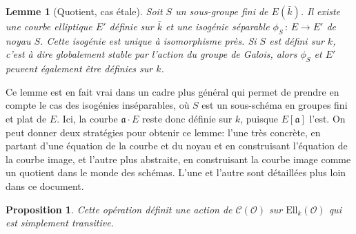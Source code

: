 \documentclass[11pt,a4paper]{article}
\renewcommand{\O}{\mathcal{O}}
\newcommand{\Cl}{\mathcal{C}}
\newcommand{\vers}{\longrightarrow}
\newcommand{\Ell}{\mathrm{Ell}}
\renewcommand{\frak}{\mathfrak}
\newcommand{\de}{\,:\,}
\newtheorem*{lem}{Lemme}
\newtheorem*{prop}{Proposition}
\theoremstyle{definition}
\begin{document}
\begin{lem}[Quotient, cas étale] Soit $S$ un sous-groupe fini de $E(\bar{k})$. Il existe une courbe elliptique $E'$ définie sur $\bar{k}$ et une isogénie séparable $\phi_S\de E\vers E'$ de noyau $S$. Cette isogénie est unique à isomorphisme près. Si $S$ est défini sur $k$, c'est à dire globalement stable par l'action du groupe de Galois, alors $\phi_S$ et $E'$ peuvent également être définies sur $k$.
\end{lem} 

Ce lemme est en fait vrai dans un cadre plus général qui permet de prendre en compte le cas des isogénies inséparables, où $S$ est un sous-schéma en groupes fini et plat de $E$. Ici, la courbe $\frak a\cdot E$ reste donc définie sur $k$, puisque $E[\frak a]$ l'est. On peut donner deux stratégies pour obtenir ce lemme: l'une très concrète, en partant d'une équation de la courbe et du noyau et en construisant l'équation de la courbe image, et l'autre plus abstraite, en construisant la courbe image comme un quotient dans le monde des schémas. L'une et l'autre sont détaillées plus loin dans ce document.


\begin{prop}

Cette opération définit une action de $\Cl(\O)$ sur $\Ell_k(\O)$ qui est simplement transitive.

\end{prop}
\end{document}
